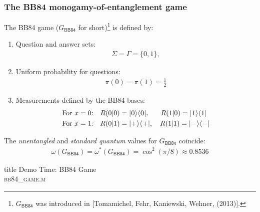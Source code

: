 \documentclass{beamer}
\def\BB84{\mathsf{BB84}}
\newcommand{\microspace}{\mspace{0.5mu}}
\newcommand{\ket}[1]{
  \lvert\microspace #1 \microspace \rangle}
\newcommand{\bra}[1]{
  \langle\microspace #1 \microspace \rvert}
\begin{document}
\begin{frame}
	\frametitle{The BB84 monogamy-of-entanglement game}
	The BB84 game ($G_{\BB84}$ for short)\footnote{$G_{\BB84}$ was introduced in [Tomamichel, Fehr, Kaniewski, Wehner, (2013)]. } is defined by: 
	\begin{enumerate}
		\item Question and answer sets:
			\begin{align*}
				\Sigma = \Gamma = \{0,1\},
			\end{align*}
		\item Uniform probability for questions:
			\begin{align*}
				\pi(0) = \pi(1) = \frac{1}{2}
			\end{align*}
		\item Measurements defined by the BB84 bases:
			\begin{align*}
				\textnormal{For $x = 0$:}& \quad R(0|0) = \ket{0}\bra{0}, \quad \ \ R(1|0) = \ket{1}\bra{1} \\ 
				\textnormal{For $x = 1$:}& \quad R(0|1) = \ket{+}\bra{+}, \quad R(1|1) = \ket{-}\bra{-}
			\end{align*}
	\end{enumerate}
	The \emph{unentangled} and \emph{standard quantum} values for $G_{\BB84}$ coincide:
	\begin{align*}
		\omega(G_{\BB84}) = \omega^*(G_{\BB84}) = \cos^2(\pi/8) \approx 0.8536
	\end{align*}
\end{frame}

\begin{frame} [noframenumbering]
  \vfill
  \centering
  \begin{beamercolorbox}[sep=8pt,center,shadow=true,rounded=true]{title}
    Demo Time: BB84 Game \\ \textsc{bb84\_game.m}
  \end{beamercolorbox}
  \vfill
\end{frame}
\end{document}
